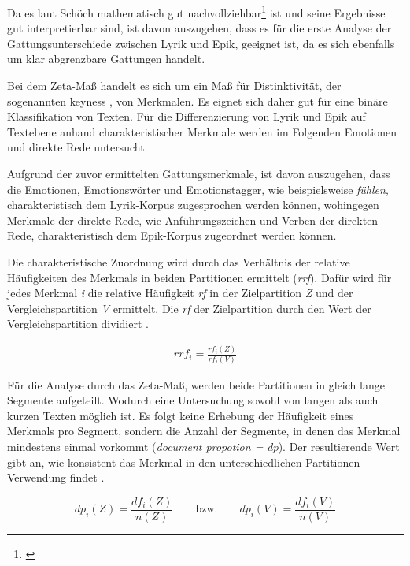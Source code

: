 \documentclass[a4paper,10p]{article}
\begin{document}
Da es laut  Schöch \glqq mathematisch gut nachvollziehbar\grqq \footnote{\citep[S. 78]{SchoechZeta}} ist und seine Ergebnisse gut interpretierbar sind, ist davon auszugehen, dass es für die erste Analyse der Gattungsunterschiede zwischen Lyrik und Epik, geeignet ist, da es sich ebenfalls um klar abgrenzbare Gattungen handelt.\par 

Bei dem Zeta-Maß handelt es sich um ein Maß für Distinktivität, der sogenannten \glq keyness \grq, von Merkmalen. Es eignet sich daher gut für eine binäre Klassifikation von Texten. Für die Differenzierung von Lyrik und Epik auf Textebene anhand charakteristischer Merkmale werden im Folgenden Emotionen und direkte Rede untersucht. \par 

Aufgrund der zuvor ermittelten Gattungsmerkmale, ist davon auszugehen, dass die Emotionen, Emotionswörter und Emotionstagger, wie beispielsweise \textit{fühlen}, charakteristisch dem Lyrik-Korpus zugesprochen werden können, wohingegen Merkmale der direkte Rede, wie Anführungszeichen und Verben der direkten Rede, charakteristisch dem Epik-Korpus zugeordnet werden können. \par 

Die charakteristische Zuordnung wird durch das Verhältnis der relative Häufigkeiten des Merkmals in beiden Partitionen ermittelt (\textit{rrf}). Dafür wird für jedes Merkmal \textit{i} die relative Häufigkeit \textit{rf} in der Zielpartition \textit{Z} und der Vergleichspartition \textit{V} ermittelt. Die \textit{rf} der Zielpartition durch den Wert der Vergleichspartition dividiert \citep[vgl.][S. 79 f.]{SchoechZeta}.\par

\begin{align}
rrf_{i}=\frac{rf_{i}(Z)}{rf_{i}(V)}
\end{align}

Für die Analyse durch das Zeta-Maß, werden beide Partitionen in gleich lange Segmente aufgeteilt. Wodurch eine Untersuchung sowohl von langen als auch kurzen Texten möglich ist. Es folgt keine Erhebung der Häufigkeit eines Merkmals pro Segment, sondern die Anzahl der Segmente, in denen das Merkmal mindestens einmal vorkommt (\textit{document propotion = dp}). Der resultierende Wert gibt an, wie konsistent das Merkmal in den unterschiedlichen Partitionen Verwendung findet \citep[vgl.][S. 79 f.]{SchoechZeta}.\par


\begin{equ}[h]
		\begin{equation}
	dp_{i}(Z)=\frac{df_{i}(Z)}{n(Z)} \qquad  \mathrm{ bzw.} \qquad  dp_{i}(V)=\frac{df_{i}(V)}{n(V)}
	\end{equation}
\end{equ}
\end{document}
